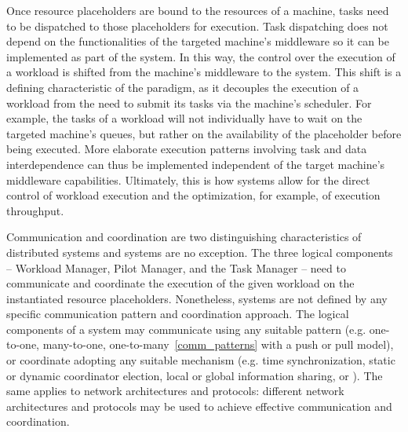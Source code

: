 \documentclass{sig-alternate}
\begin{document}
Once resource placeholders are bound to the resources of a machine, tasks need
to be dispatched to those placeholders for execution. Task dispatching does not
depend on the functionalities of the targeted machine's middleware so it can be
implemented as part of the \pilotjob system. In this way, the control over the
execution of a workload is shifted from the machine's middleware to the \pilot
system. This shift is a defining characteristic of the \pilot paradigm, as it
decouples the execution of a workload from the need to submit its tasks via the
machine's scheduler. For example, the tasks of a workload will not individually
have to wait on the targeted machine's queues, but rather on the availability of
the placeholder before being executed. More elaborate execution patterns
involving task and data interdependence can thus be implemented
independent of %
the target machine's middleware capabilities. Ultimately, this is how \pilotjob
systems allow for the direct control of workload execution and the optimization,
for example, of execution throughput. 

Communication and coordination are two distinguishing characteristics of
distributed systems and \pilotjob systems are no exception. The three logical
components -- Workload Manager, Pilot Manager, and the Task Manager -- need to
communicate and coordinate the execution of the given workload on the
instantiated resource placeholders.  Nonetheless, \pilotjob systems are not
defined by any specific communication pattern and coordination approach. The
logical components of a \pilotjob system may communicate using any suitable
pattern (e.g. one-to-one, many-to-one, one-to-many~\ref{comm_patterns} with a
push or pull model), or coordinate adopting any suitable mechanism (e.g. time
synchronization, static or dynamic coordinator election, local or global
information sharing, or \MW). The same applies to network architectures and
protocols: different network architectures and protocols may be used to achieve
effective communication and coordination.
\end{document}

